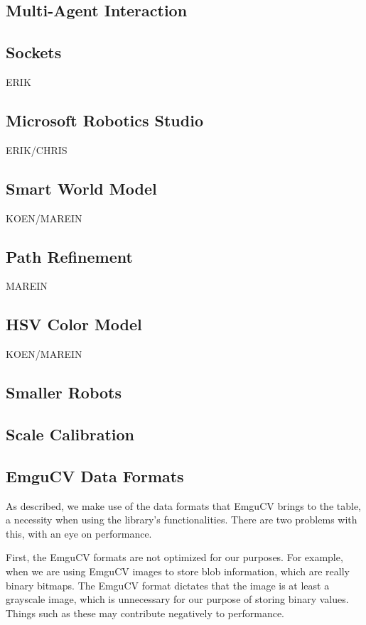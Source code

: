 \documentclass[10pt,twocolumn]{article}
\begin{document}
\subsection{Multi-Agent Interaction}

\subsection{Sockets}
ERIK

\subsection{Microsoft Robotics Studio}
ERIK/CHRIS

\subsection{Smart World Model}
KOEN/MAREIN

\subsection{Path Refinement}
MAREIN

\subsection{HSV Color Model}
KOEN/MAREIN

\subsection{Smaller Robots}

\subsection{Scale Calibration}

\subsection{EmguCV Data Formats}
As described, we make use of the data formats that EmguCV brings to the table, a necessity when using the library's functionalities. There are two problems with this, with an eye on performance.

First, the EmguCV formats are not optimized for our purposes. For example, when we are using EmguCV images to store blob information, which are really binary bitmaps. The EmguCV format dictates that the image is at least a grayscale image, which is unnecessary for our purpose of storing binary values. Things such as these may contribute negatively to performance.
\end{document}
